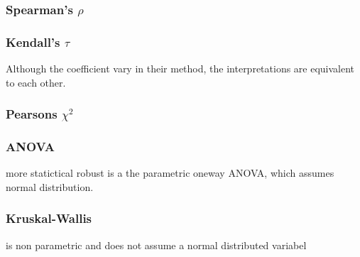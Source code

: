 \documentclass[a4paper,12pt]{report}
\begin{document}
\bigskip

\subsubsection{Spearman's $\rho$}

%

\subsubsection{Kendall's $\tau$}

%

 Although the coefficient vary in their method, the interpretations are equivalent to each other.

\subsubsection{Pearsons $\chi^2$}

%

\subsubsection{ANOVA}
more statictical robust
is a the parametric oneway ANOVA, which assumes normal distribution.

\subsubsection{Kruskal-Wallis}

is non parametric and does not assume a normal distributed variabel
\end{document}
